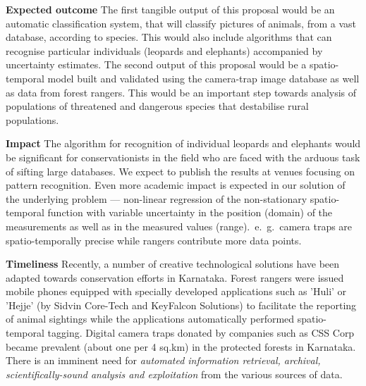 \documentclass[a4paper,10pt,twocolumn]{article}
\newcommand{\hdg}[1] {\noindent \textbf{#1} }
\begin{document}
\hdg{Expected outcome} The first tangible output of this proposal would be an automatic classification system, that will classify pictures of animals, from a vast database, according to species. This would also include algorithms that can recognise particular individuals (leopards and elephants) accompanied by uncertainty estimates. The second output of this proposal would be a spatio-temporal model built and validated using the camera-trap image database as well as data from forest rangers. This would be an important step towards analysis of populations of threatened and dangerous species that destabilise rural populations.


\hdg{Impact} The algorithm for recognition of individual leopards and elephants would be significant for conservationists in the field who are faced with the arduous task of sifting large databases. We expect to publish the results at venues focusing on pattern recognition. Even more academic impact is expected in our solution of the underlying problem --- non-linear regression of the non-stationary spatio-temporal function with variable uncertainty in the position (domain) of the measurements as well as in the measured values (range).~e.~g.~camera traps are spatio-temporally precise while rangers contribute more data points.

\hdg{Timeliness}
Recently, a number of creative technological solutions have been adapted towards conservation efforts in Karnataka. Forest rangers were issued mobile phones equipped with specially developed applications such as 'Huli' or 'Hejje' (by Sidvin Core-Tech and KeyFalcon Solutions) to facilitate the reporting of animal sightings while the applications automatically performed spatio-temporal tagging. Digital camera traps donated by companies such as CSS Corp became prevalent (about one per 4 sq.km) in the protected forests in Karnataka. 
There is an imminent need for \textit{automated information retrieval, archival, scientifically-sound analysis and exploitation} from the various sources of data. 
\end{document}
